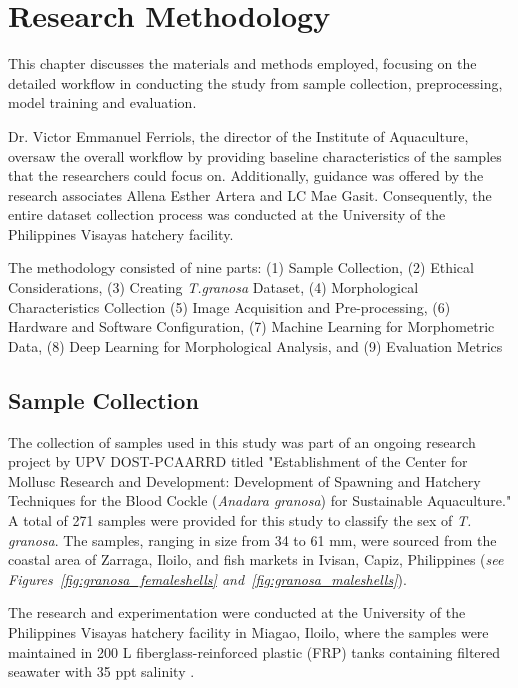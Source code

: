 \chapter{Research Methodology}
\label{sec:methodology}

This chapter discusses the materials and methods employed, focusing on the detailed workflow in conducting the study from sample collection, preprocessing, model training and evaluation. 

Dr. Victor Emmanuel Ferriols, the director of the Institute of Aquaculture, oversaw the overall workflow by providing baseline characteristics of the samples that the researchers could focus on. Additionally, guidance was offered by the research associates Allena Esther Artera and LC Mae Gasit. Consequently, the entire dataset collection process was conducted at the University of the Philippines Visayas hatchery facility.

The methodology consisted of nine parts: (1) Sample Collection, (2) Ethical Considerations, (3) Creating \textit{T.granosa} Dataset, (4) Morphological Characteristics Collection (5) Image Acquisition and Pre-processing, (6) Hardware and Software Configuration, (7) Machine Learning for Morphometric Data, (8) Deep Learning for Morphological Analysis, and (9) Evaluation Metrics

\section{Sample Collection}
\label{sec:samplecollect} 

The collection of \Tgranosa samples used in this study was part of an ongoing research project by UPV DOST-PCAARRD titled "Establishment of the Center for Mollusc Research and Development: Development of Spawning and Hatchery Techniques for the Blood Cockle (\textit{Anadara granosa}) for Sustainable Aquaculture." A total of 271 samples were provided for this study to classify the sex of \textit{T. granosa}. The samples, ranging in size from 34 to 61 mm, were sourced from the coastal area of Zarraga, Iloilo, and fish markets in Ivisan, Capiz, Philippines (\textit{see Figures~\ref{fig:granosa_femaleshells} and~\ref{fig:granosa_maleshells}}).


The research and experimentation were conducted at the University of the Philippines Visayas hatchery facility in Miagao, Iloilo, where the samples were maintained in 200 L fiberglass-reinforced plastic (FRP) tanks containing filtered seawater with 35 ppt salinity \cite{miranda2023}.


